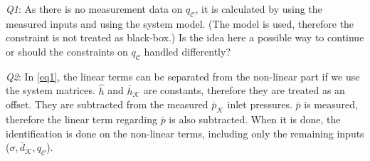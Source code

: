 \emph{Q1}: As there is no measurement data on $q_\mathcal{C}$, it is calculated  by using the measured inputs and using the system model. (The model is used, therefore the constraint is not treated as black-box.) Is the idea here a possible way to continue or should the constraints on $q_\mathcal{C}$ handled differently? 

\emph{Q2}: In \eqref{eq1}, the linear terms can be separated from the non-linear part if we use the system matrices. $\hat{h}$ and $\bar{h}_{\mathcal{K}}$ are constants, therefore they are treated as an offset. They are subtracted from the measured $\bar{p}_{\mathcal{K}}$ inlet pressures. $\bar{p}$ is measured, therefore the linear term regarding $\bar{p}$ is also subtracted. When it is done, the identification is done on the non-linear terms, including only the remaining inputs ($\sigma,\bar{d}_{\mathcal{K}}, q_\mathcal{C}$). 

